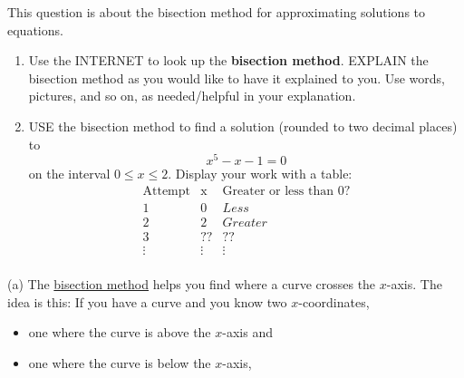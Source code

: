 \documentclass{ximera}
\begin{document}
\begin{question} This question is about the bisection method for approximating solutions to equations.
  \begin{enumerate}
    \item Use the INTERNET to look up the \textbf{bisection
      method}. EXPLAIN the bisection method as you would like to have
      it explained to you.  Use words, pictures, and so on, as
      needed/helpful in your explanation.
  \item USE the bisection method to find a solution (rounded to two
    decimal places) to
  \[
  x^5-x-1=0
  \]
  on the interval $0\le x\le 2$. Display your work with a table:
  \[
  \begin{array}{|c|c|c|c|}\hline
    \text{Attempt} & \text{x} & \text{Greater or less than $0$?} \\ \hline\hline
    1 & 0 & Less \\ \hline
    2 & 2 & Greater  \\ \hline
    3 & ?? & ??  \\ \hline
    \vdots & \vdots & \vdots \\ 
  \end{array}
  \]
  \end{enumerate}
  \begin{freeResponse}
    (a) The \underline{bisection method} helps you find where a curve
    crosses the $x$-axis. The idea is this: If you have a curve and
    you know two $x$-coordinates,
    \begin{itemize}
      \item one where the curve is above the
        $x$-axis and
      \item one where the curve is below the $x$-axis,
    \end{itemize}
    \begin{center}
\end{center}
\end{freeResponse}
\end{question}
\end{document}
